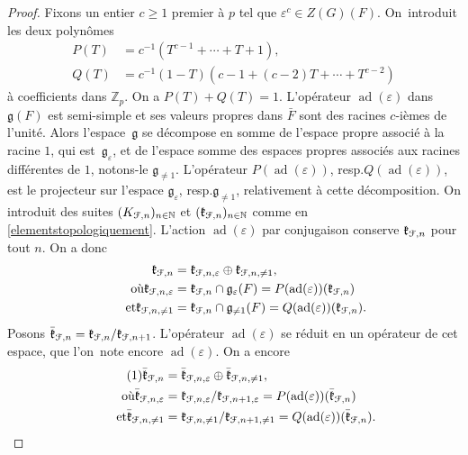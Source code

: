 \documentclass[11pt]{article}
\newcommand{\resp}{resp.\xspace}
\numberwithin{equation}{section}\providecommand{\og}{«\,}\providecommand{\fg}{\,»}
\let\mathcal \EuScript
\let\epsilon\varepsilon
\newcommand{\frg}{\mathfrak{g}}
\newcommand{\frk}{\mathfrak{k}}
\DeclareMathOperator{\ad}{ad}
\newcommand{\cF}{\mathcal{F}}
\newcommand{\NN}{\mathbb{N}}
\newcommand{\ZZ}{\mathbb{Z}}
\theoremstyle{plain}
\theoremstyle{definition}
\begin{document}
\begin{proof}
Fixons un entier $c\geq1$ premier à $p$ tel que $\epsilon^c\in Z(G)(F)$. On~intro\-duit les deux polynômes
\begin{align*}
P(T)&=c^{-1}(T^{c-1}+\cdots+T+1),\\
Q(T)&=c^{-1}(1-T)(c-1+(c-2)T+\cdots+T^{c-2})
\end{align*}
à coefficients dans $\ZZ_{p}$. On a $P(T)+Q(T)=1$.
L'opérateur $\ad(\epsilon)$ dans $\frg(F)$ est semi-simple et ses valeurs propres dans $\bar{F}$ sont des racines $c$-ièmes de l'unité. Alors l'espace~$\frg$ se décompose en somme de l'espace propre associé à la racine $1$, qui est~$\frg_{\epsilon}$, et de l'espace somme des espaces propres associés aux racines différentes de $1$, notons-le $\frg_{\neq1}$. L'opérateur $P(\ad(\epsilon))$, \resp $Q(\ad(\epsilon))$, est le projecteur sur l'espace $\frg_{\epsilon}$, \resp $\frg_{\neq1}$, relativement à cette décomposition.
On introduit des suites $(K_{\cF,n})_{n\in \NN}$ et $(\frk_{\cF,n})_{n\in \NN}$ comme en \ref{elementstopologiquement}. L'action $\ad(\epsilon)$ par conjugaison conserve $\frk_{\cF,n}$ pour tout $n$. On a donc
\begin{align*}
\frk_{\cF,n}&=\frk_{\cF,n,\epsilon}\oplus \frk_{\cF,n,\neq1},
\\
\tag*{où}
\frk_{\cF,n,\epsilon}&=\frk_{\cF,n}\cap \frg_{\epsilon}(F)=P(\ad(\epsilon))(\frk_{\cF,n})\\
\tag*{et}
\frk_{\cF,n,\neq1}&=\frk_{\cF,n}\cap \frg_{\neq1}(F)=Q(\ad(\epsilon))(\frk_{\cF,n}).
\end{align*}
Posons $\bar{\frk}_{\cF,n}=\frk_{\cF,n}/\frk_{\cF,n+1}$. L'opérateur $\ad(\epsilon)$ se réduit en un opérateur de cet espace, que l'on~note encore $\ad(\epsilon)$. On a encore
\begin{align*}
\tag{1}\label{commutant1}
\bar{\frk}_{\cF,n}&=\bar{\frk}_{\cF,n,\epsilon}\oplus \bar{\frk}_{\cF,n,\neq1},
\\
\tag*{où}
\bar{\frk}_{\cF,n,\epsilon}&=\frk_{\cF,n,\epsilon}/\frk_{\cF,n+1,\epsilon}=P(\ad(\epsilon))(\bar{\frk}_{\cF,n})\\
\tag*{et}
\bar{\frk}_{\cF,n,\neq1}&=\frk_{\cF,n,\neq1}/\frk_{\cF,n+1,\neq1}=Q(\ad(\epsilon))(\bar{\frk}_{\cF,n}).
\end{align*}


\end{proof}
\end{document}
